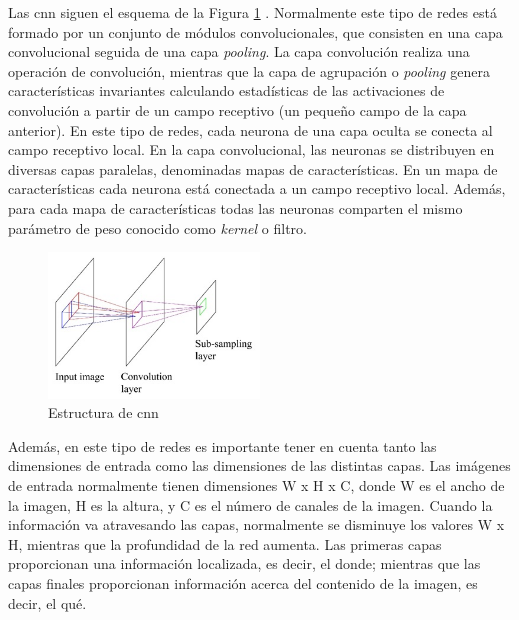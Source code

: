 Las \acrshort{cnn} siguen el esquema de la Figura \ref{fig.arquitectura_cnn} \cite{rna8}. Normalmente este tipo de redes está formado por un conjunto de módulos convolucionales, que consisten en una capa convolucional seguida de una capa \textit{pooling}. La capa convolución realiza una operación de convolución, mientras que la capa de agrupación o \textit{pooling} genera características invariantes calculando estadísticas de las activaciones de convolución a partir de un campo receptivo (un pequeño campo de la capa anterior). En este tipo de redes, cada neurona de una capa oculta se conecta al campo receptivo local. En la capa convolucional, las neuronas se distribuyen en diversas capas paralelas, denominadas mapas de características. En un mapa de características cada neurona está conectada a un campo receptivo local. Además, para cada mapa de características todas las neuronas comparten el mismo parámetro de peso conocido como \textit{kernel} o filtro.\\


\begin{figure}[H]
  \begin{center}
    \includegraphics[width=0.5\textwidth]{figures/Introduccion/arquitectura_cnn.png}
		\caption{Estructura de \acrshort{cnn}}
		\label{fig.arquitectura_cnn}
		\end{center}
\end{figure}

Además, en este tipo de redes es importante tener en cuenta tanto las dimensiones de entrada como las dimensiones de las distintas capas. Las imágenes de entrada normalmente tienen dimensiones W x H x C, donde W es el ancho de la imagen, H es la altura, y C es el número de canales de la imagen. Cuando la información va atravesando las capas, normalmente se disminuye los valores W x H, mientras que la profundidad de la red aumenta. Las primeras capas proporcionan una información localizada, es decir, el donde; mientras que las capas finales proporcionan información acerca del contenido de la imagen, es decir, el qué.



